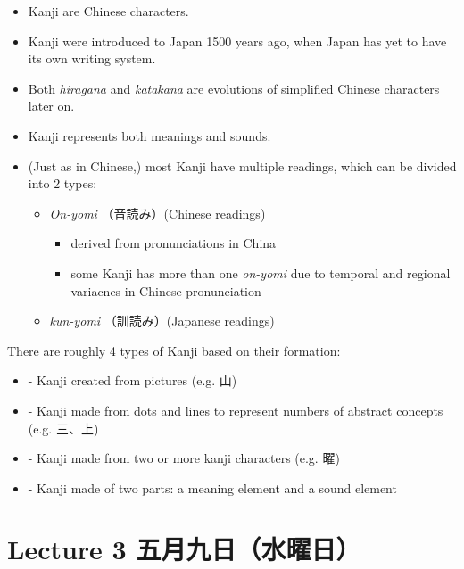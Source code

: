 \documentclass[notoc,notitlepage]{tufte-book}
\begin{document}
\begin{note}
  \begin{itemize}
    \item Kanji are Chinese characters.
    \item Kanji were introduced to Japan 1500 years ago, when Japan has yet to have its own writing system.
    \item Both \textit{hiragana} and \textit{katakana} are evolutions of simplified Chinese characters later on.
    \item Kanji represents both meanings and sounds.
    \item (Just as in Chinese,) most Kanji have multiple readings, which can be divided into 2 types:
      \begin{itemize}
        \item \textit{On-yomi} （音読み）(Chinese readings)
          \begin{itemize}
            \item derived from pronunciations in China
            \item some Kanji has more than one \textit{on-yomi} due to temporal and regional variacnes in Chinese pronunciation
          \end{itemize}
        \item \textit{kun-yomi} （訓読み）(Japanese readings)
      \end{itemize}
  \end{itemize}
\end{note}

\begin{note}
  There are roughly 4 types of Kanji based on their formation:
  \begin{itemize}
    \item {} - Kanji created from pictures (e.g. 山)
    \item {} - Kanji made from dots and lines to represent numbers of abstract concepts (e.g. 三、上)
    \item {} - Kanji made from two or more kanji characters (e.g. 曜)
    \item {} - Kanji made of two parts: a meaning element and a sound element
  \end{itemize}
\end{note}


\chapter{Lecture 3 五月九日（水曜日）}%
\label{chp:lecture_3_wu_yue_jiu_ri_shui_yao_ri}
\end{document}
